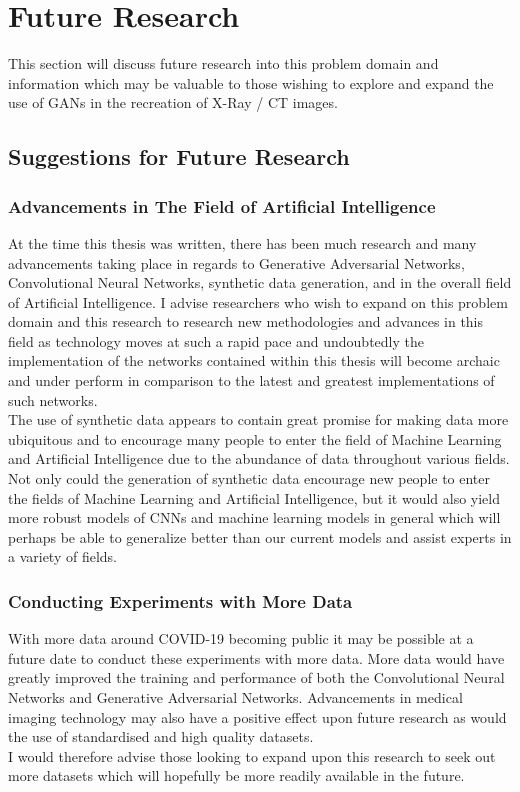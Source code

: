 \section{Future Research}
This section will discuss future research into this problem domain and information which may be valuable to those wishing to explore and expand the use of GANs in the recreation of X-Ray / CT images. 
\subsection{Suggestions for Future Research}
\subsubsection{Advancements in The Field of Artificial Intelligence}
At the time this thesis was written, there has been much research and many advancements taking place in regards to Generative Adversarial Networks, Convolutional Neural Networks, synthetic data generation, and in the overall field of Artificial Intelligence.  I advise researchers who wish to expand on this problem domain and this research to research new methodologies and advances in this field as technology moves at such a rapid pace and undoubtedly the implementation of the networks contained within this thesis will become archaic and under perform in comparison to the latest and greatest implementations of such networks.
\\
The use of synthetic data appears to contain great promise for making data more ubiquitous and to encourage many people to enter the field of Machine Learning and Artificial Intelligence due to the abundance of data throughout various fields.  Not only could the generation of synthetic data encourage new people to enter the fields of Machine Learning and Artificial Intelligence, but it would also yield more robust models of CNNs and machine learning models in general which will perhaps be able to generalize better than our current models and assist experts in a variety of fields.
\subsubsection{Conducting Experiments with More Data}
With more data around COVID-19 becoming public it may be possible at a future date to conduct these experiments with more data.  More data would have greatly improved the training and performance of both the Convolutional Neural Networks and Generative Adversarial Networks.  Advancements in medical imaging technology may also have a positive effect upon future research as would the use of standardised and high quality datasets.  
\\
I would therefore advise those looking to expand upon this research to seek out more datasets which will hopefully be more readily available in the future. 
